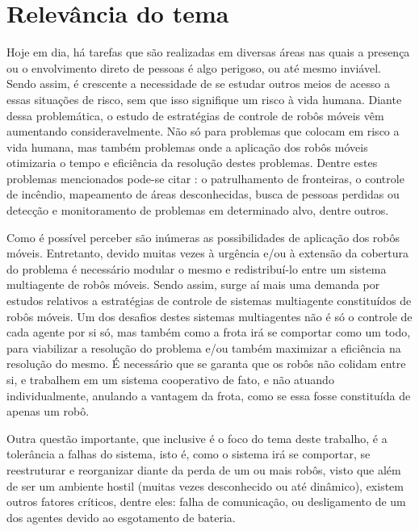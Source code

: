 \section{Relevância do tema}
\label{sec:relevancia}

Hoje em dia, há tarefas que são realizadas em diversas áreas nas quais a presença ou o envolvimento direto de pessoas é algo perigoso, ou até mesmo inviável. Sendo assim, é crescente a necessidade de se estudar outros meios de acesso a essas situações de risco, sem que isso signifique um risco à vida humana. Diante dessa problemática, o estudo de estratégias de controle de robôs móveis vêm aumentando consideravelmente. Não só para problemas que colocam em risco a vida humana, mas também problemas onde a aplicação dos robôs móveis otimizaria o tempo e eficiência da resolução destes problemas. Dentre estes problemas mencionados pode-se citar \cite{GARHAS04,JTA13,MANJ09} : o patrulhamento de fronteiras, o controle de incêndio, mapeamento de áreas desconhecidas, busca de pessoas perdidas ou detecção e monitoramento de problemas em determinado alvo, dentre outros. 

Como é possível perceber são inúmeras as possibilidades de aplicação dos robôs móveis. Entretanto, devido muitas vezes à urgência e/ou à extensão da cobertura do problema é necessário modular o mesmo e redistribuí-lo entre um sistema multiagente de robôs móveis. Sendo assim, surge aí mais uma demanda por estudos relativos a estratégias de controle de sistemas multiagente constituídos de robôs móveis. 
Um dos desafios destes sistemas multiagentes não é só o controle de cada agente por si só, mas também como a frota irá se comportar como um todo, para viabilizar a resolução do problema e/ou também maximizar a eficiência na resolução do mesmo. É necessário que se garanta que os robôs não colidam entre si, e trabalhem em um sistema cooperativo de fato, e não atuando individualmente, %
anulando a vantagem da frota, como se essa fosse constituída de apenas um robô. 

Outra questão importante, que inclusive é o foco do tema deste trabalho, é a tolerância a falhas do sistema, isto é, como o sistema irá se comportar, se reestruturar e reorganizar diante da perda de um ou mais robôs, visto que além de ser um ambiente hostil (muitas vezes desconhecido ou até dinâmico), existem outros fatores críticos, dentre eles: falha de comunicação, ou desligamento de um dos agentes devido ao esgotamento de bateria.

